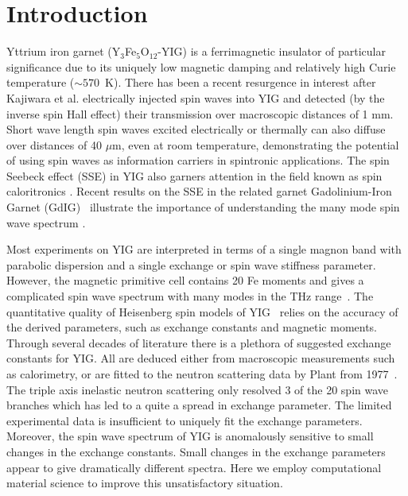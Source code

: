 \documentclass[aps,pre,reprint,superscriptaddress,longbibliography]{revtex4-1}
\begin{document}
\section{Introduction}
Yttrium iron garnet (Y$_{3}$Fe$_{5}$O$_{12}$-YIG) is a ferrimagnetic insulator of particular significance due to its uniquely low magnetic damping and relatively high Curie temperature ($\sim570$~K). There has been a recent resurgence in interest after Kajiwara et al. \cite{Kajiwara2010} electrically injected spin waves into YIG  and detected (by the inverse spin Hall effect) their transmission over macroscopic distances of 1 mm. Short wave length spin waves excited electrically \cite{Cornelissen2015}
or thermally \cite{Brandon2015} can also diffuse over distances of 40 $\mu$m,
even at room temperature, demonstrating the potential of using spin waves as information carriers in spintronic applications. The spin Seebeck effect (SSE) in YIG \cite{Uchida2010,Uchida2010apl} also garners attention in the field known as spin caloritronics \cite{Bauer2012}. Recent results on the SSE in the related garnet Gadolinium-Iron Garnet (GdIG)~\cite{Geprags2016} illustrate the importance of understanding the many mode  spin wave spectrum \cite{Xiao:2010uc}.   
  

Most experiments on YIG are interpreted in terms of a single magnon band with parabolic dispersion and a single exchange or spin wave stiffness parameter. However, the magnetic primitive cell contains 20 Fe moments and gives a complicated spin wave spectrum with many modes in the THz range~\cite{Harris1963}. The quantitative quality of  Heisenberg spin models of YIG~\cite{Barker:2016tr} relies on the accuracy of the derived parameters, such as exchange constants and magnetic moments. Through several decades of literature there is a plethora of suggested exchange constants for YIG. All are deduced either from macroscopic measurements such as calorimetry, or are fitted to the neutron scattering data by Plant from 1977~\cite{Plant1977}. The triple axis inelastic neutron scattering only resolved  3 of the 20 spin wave branches which has led to a  quite a spread in exchange parameter. The limited experimental data is insufficient to uniquely fit the exchange parameters. Moreover, the spin wave spectrum of YIG is anomalously sensitive to small changes in the exchange constants. Small changes in the exchange parameters appear to give dramatically different spectra. Here we employ computational material science to improve this unsatisfactory situation.
\end{document}
